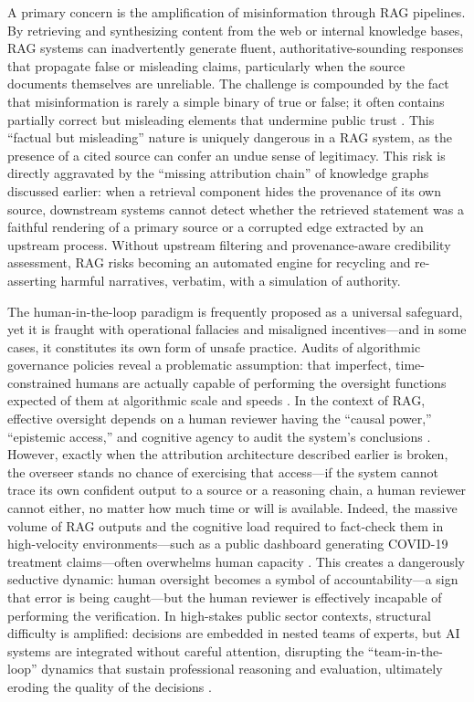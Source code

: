 \documentclass[11pt]{article}
\begin{document}
A primary concern is the amplification of misinformation through RAG pipelines. By retrieving and synthesizing content from the web or internal knowledge bases, RAG systems can inadvertently generate fluent, authoritative-sounding responses that propagate false or misleading claims, particularly when the source documents themselves are unreliable. The challenge is compounded by the fact that misinformation is rarely a simple binary of true or false; it often contains partially correct but misleading elements that undermine public trust \cite{ref260}. This ``factual but misleading'' nature is uniquely dangerous in a RAG system, as the presence of a cited source can confer an undue sense of legitimacy. This risk is directly aggravated by the ``missing attribution chain'' of knowledge graphs discussed earlier: when a retrieval component hides the provenance of its own source, downstream systems cannot detect whether the retrieved statement was a faithful rendering of a primary source or a corrupted edge extracted by an upstream process. Without upstream filtering and provenance-aware credibility assessment, RAG risks becoming an automated engine for recycling and re-asserting harmful narratives, verbatim, with a simulation of authority.

The human-in-the-loop paradigm is frequently proposed as a universal safeguard, yet it is fraught with operational fallacies and misaligned incentives---and in some cases, it constitutes its own form of unsafe practice. Audits of algorithmic governance policies reveal a problematic assumption: that imperfect, time-constrained humans are actually capable of performing the oversight functions expected of them at algorithmic scale and speeds \cite{ref261}. In the context of RAG, effective oversight depends on a human reviewer having the ``causal power,'' ``epistemic access,'' and cognitive agency to audit the system's conclusions \cite{ref262}. However, exactly when the attribution architecture described earlier is broken, the overseer stands no chance of exercising that access---if the system cannot trace its own confident output to a source or a reasoning chain, a human reviewer cannot either, no matter how much time or will is available. Indeed, the massive volume of RAG outputs and the cognitive load required to fact-check them in high-velocity environments---such as a public dashboard generating COVID-19 treatment claims---often overwhelms human capacity \cite{ref263}. This creates a dangerously seductive dynamic: human oversight becomes a symbol of accountability---a sign that error is being caught---but the human reviewer is effectively incapable of performing the verification. In high-stakes public sector contexts, structural difficulty is amplified: decisions are embedded in nested teams of experts, but AI systems are integrated without careful attention, disrupting the ``team-in-the-loop'' dynamics that sustain professional reasoning and evaluation, ultimately eroding the quality of the decisions \cite{ref264}.
\end{document}
